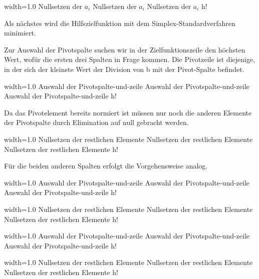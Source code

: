 \documentclass{eegreport}
\begin{document}
       {width=1.0\textwidth}
       {Nullsetzen der $a_i$}
       {Nullsetzen der $a_i$}
       {Nullsetzen der $a_i$}
       {h!}      
       
Als nächstes wird die Hilfszielfunktion mit dem Simplex-Standardverfahren minimiert.

Zur Auswahl der Pivotspalte suchen wir in der Zielfunktionszeile den höchsten Wert, wofür die ersten drei Spalten in Frage
kommen. Die Pivotzeile ist diejenige, in der sich der kleinste Wert der Division von b mit der Pivot-Spalte befindet.    
       
       {width=1.0\textwidth}
       {Auswahl der Pivotspalte-und-zeile}
       {Auswahl der Pivotspalte-und-zeile}
       {Auswahl der Pivotspalte-und-zeile}
       {h!}     
       
Da das Pivotelement bereits normiert ist müssen nur noch die anderen Elemente der Pivotspalte durch Elimination auf null gebracht werden.       
       
      
       
       {width=1.0\textwidth}
       {Nullsetzen der restlichen Elemente}
       {Nullsetzen der restlichen Elemente}
       {Nullsetzen der restlichen Elemente}
       {h!}          
       
       
Für die beiden anderen Spalten erfolgt die Vorgehensweise analog.
       
       
       {width=1.0\textwidth}
       {Auswahl der Pivotspalte-und-zeile}
       {Auswahl der Pivotspalte-und-zeile}
       {Auswahl der Pivotspalte-und-zeile}
       {h!}          




       
       {width=1.0\textwidth}
       {Nullsetzen der restlichen Elemente}
       {Nullsetzen der restlichen Elemente}
       {Nullsetzen der restlichen Elemente}
       {h!} 

\newpage
{}
       {width=1.0\textwidth}
       {Auswahl der Pivotspalte-und-zeile}
       {Auswahl der Pivotspalte-und-zeile}
       {Auswahl der Pivotspalte-und-zeile}
       {h!} 
       

\newpage
{}
       {width=1.0\textwidth}
       {Nullsetzen der restlichen Elemente}
       {Nullsetzen der restlichen Elemente}
       {Nullsetzen der restlichen Elemente}
       {h!} 
\end{document}
